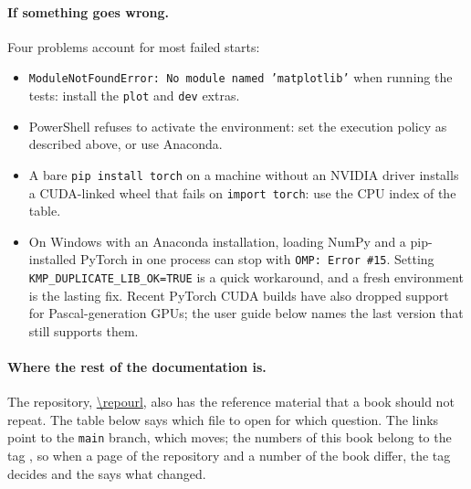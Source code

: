 \paragraph{If something goes wrong.} Four problems account for most failed starts:
\begin{itemize}
\item \texttt{ModuleNotFoundError: No module named 'matplotlib'} when running the tests: install the \texttt{plot} and \texttt{dev} extras.
\item PowerShell refuses to activate the environment: set the execution policy as described above, or use Anaconda.
\item A bare \texttt{pip install torch} on a machine without an NVIDIA driver installs a CUDA-linked wheel that fails on \texttt{import torch}: use the CPU index of the table.
\item On Windows with an Anaconda installation, loading NumPy and a pip-installed PyTorch in one process can stop with \texttt{OMP: Error \#15}. Setting \texttt{KMP\_DUPLICATE\_LIB\_OK=TRUE} is a quick workaround, and a fresh environment is the lasting fix. Recent PyTorch CUDA builds have also dropped support for Pascal-generation GPUs; the user guide below names the last version that still supports them.
\end{itemize}

\paragraph{Where the rest of the documentation is.} The repository, \url{\repourl}, also has the reference material that a book should not repeat. The table below says which file to open for which question. The links point to the \texttt{main} branch, which moves; the numbers of this book belong to the tag \booktag{}, so when a page of the repository and a number of the book differ, the tag decides and the  says what changed.


